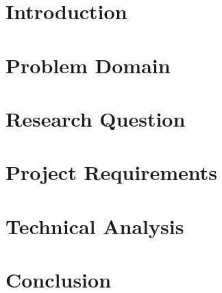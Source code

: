\documentclass[12pt]{article}
\begin{document}
\section{Introduction}
  
  \section{Problem Domain}
  
  \section{Research Question}
  
  \section{Project Requirements}
  
  \section{Technical Analysis}
  
   \section{Conclusion}
  









	
\end{document}
